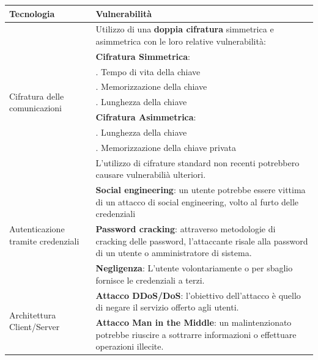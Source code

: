 \documentclass[a4paper]{article}
\begin{document}
\begin{center}
    \begin{tabularx}{1\textwidth}{|l|X|}
        \hline
        \textbf{Tecnologia} & \textbf{Vulnerabilità} \\
        \hline
        \hline
       \multirow{9}{*}{Cifratura delle comunicazioni} & Utilizzo di una \textbf{doppia cifratura} simmetrica e asimmetrica con le loro relative vulnerabilità:\\
                                      & \quad \textbf{Cifratura Simmetrica}:\\
                                      & \quad\quad 1. Tempo di vita della chiave\\
                                      & \quad\quad 2. Memorizzazione della chiave\\
                                      & \quad\quad 3. Lunghezza della chiave\\
                                      & \quad \textbf{Cifratura Asimmetrica}:\\
                                      & \quad\quad 1. Lunghezza della chiave\\
                                      & \quad\quad 2. Memorizzazione della chiave privata\\
                                      & L'utilizzo di cifrature standard non recenti potrebbero causare vulnerabilià ulteriori.\\
        \hline
        \multirow{3}{*}{Autenticazione tramite credenziali} & \textbf{Social engineering}: un utente potrebbe essere vittima di un attacco di social engineering, volto al furto delle credenziali \\
                                           & \textbf{Password cracking}: attraverso metodologie di cracking delle password, l'attaccante risale alla password di un utente o amministratore di sistema. \\
                                           & \textbf{Negligenza}: L'utente volontariamente o per sbaglio fornisce le credenziali a terzi. \\
        \hline
        \multirow{5}{*}{Architettura Client/Server} & \textbf{Attacco DDoS/DoS}: l'obiettivo dell'attacco è quello di negare il servizio offerto agli utenti. \\
                                   & \textbf{Attacco Man in the Middle}: un malintenzionato potrebbe riuscire a sottrarre informazioni o effettuare operazioni illecite. \\

\end{tabularx}
\end{center}
\end{document}
